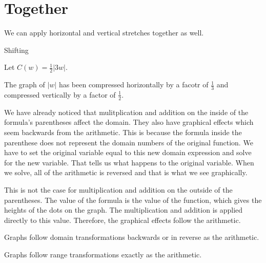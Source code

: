 \documentclass{ximera}
\begin{document}
\section{Together}

We can apply horizontal and vertical stretches together as well.





\begin{example}  Shifting

Let $C(w) = \frac{1}{2}|3w|$.


\begin{image}
\end{image}

\end{example}

The graph of $|w|$ has been compressed horizontally by a facotr of $\frac{1}{3}$ and compressed vertically by a factor of $\frac{1}{2}$.




We have already noticed that mulitplication and addition on the inside of the formula's parentheses affect the domain.  They also have graphical effects which seem backwards from the arithmetic.  This is because the formula inside the parenthese does not represent the domain numbers of the original function.  We have to set the original variable equal to this new domain expression and solve for the new variable.  That tells us what happens to the original variable.  When we solve, all of the arithmetic is reversed and that is what we see graphically.

This is not the case for multiplication and addition on the outside of the parentheses.  The value of the formula is the value of the function, which gives the heights of the dots on the graph.  The multiplication and addition is applied directly to this value.  Therefore, the graphical effects follow the arithmetic.


\begin{center}

Graphs follow domain transformations backwards or in reverse as the arithmetic.


\end{center}


\begin{center}

Graphs follow range transformations exactly as the arithmetic.


\end{center}
\end{document}

